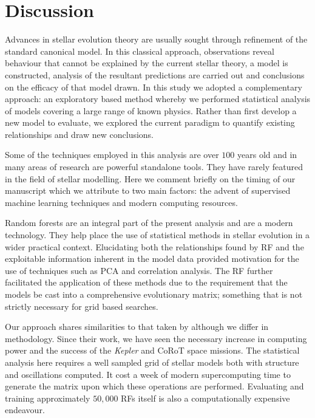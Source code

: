 \section{Discussion}
\label{sec:disc}


Advances in stellar evolution theory are usually sought through refinement of the standard canonical model.  In this classical approach, observations reveal  behaviour that cannot be explained by the current stellar theory, a model is constructed, analysis of the resultant predictions are carried out and conclusions on the efficacy of that model drawn. In this study we adopted a complementary approach: an exploratory based method whereby we performed statistical analysis of models covering a large range of known physics. Rather than first develop a new model to evaluate, we explored the current paradigm to quantify existing relationships and draw new conclusions.  

Some of the techniques employed in this analysis are over $100$ years old and in many areas of research are powerful standalone tools. They have rarely featured in the field of stellar modelling. Here we comment briefly on the timing of our manuscript which we attribute to two main factors: the advent of supervised machine learning techniques and modern computing resources.  

Random forests are an integral part of the present analysis and are a modern technology.
They help place the use of statistical methods in stellar evolution in a wider practical context.  Elucidating both the relationships found by RF and the exploitable information inherent in the model data provided motivation for the use of techniques such as PCA and correlation analysis.  The RF further facilitated the application of these methods due to the requirement that the models be cast  into a comprehensive evolutionary matrix; something that is not strictly necessary for grid based searches.     

Our approach shares similarities to that taken by \citet{1994ApJ...427.1013B} although we differ in methodology. Since their work, we have seen the necessary increase in computing power and the success of the \emph{Kepler} and CoRoT space missions.  The statistical analysis here requires a well sampled grid of stellar models both with structure and oscillations computed. It cost a week of modern supercomputing time to generate the matrix upon which these operations are performed. Evaluating and training approximately $50,000$  RFs itself is also a computationally expensive endeavour.


